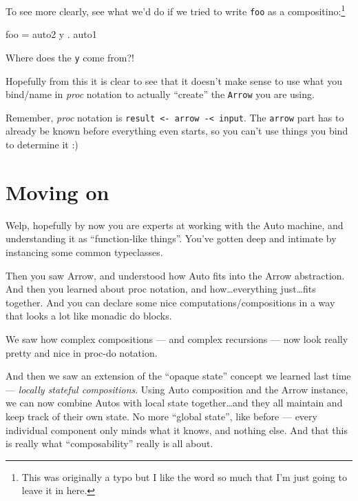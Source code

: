 \documentclass[]{article}
\newenvironment{Shaded}{}{}
\newcommand{\FunctionTok}[1]{\textcolor[rgb]{0.02,0.16,0.49}{#1}}
\newcommand{\NormalTok}[1]{#1}
\begin{document}
To see more clearly, see what we'd do if we tried to write \texttt{foo} as a
compositino:\footnote{This was originally a typo but I like the word so much
  that I'm just going to leave it in here.}

\begin{Shaded}
\begin{Highlighting}[]
\NormalTok{foo }\FunctionTok{=}\NormalTok{ auto2 y }\FunctionTok{.}\NormalTok{ auto1}
\end{Highlighting}
\end{Shaded}

Where does the \texttt{y} come from?!

Hopefully from this it is clear to see that it doesn't make sense to use what
you bind/name in \emph{proc} notation to actually ``create'' the \texttt{Arrow}
you are using.

Remember, \emph{proc} notation is
\texttt{result\ \textless{}-\ arrow\ -\textless{}\ input}. The \texttt{arrow}
part has to already be known before everything even starts, so you can't use
things you bind to determine it :)

\hypertarget{moving-on}{%
\section{Moving on}\label{moving-on}}

Welp, hopefully by now you are experts at working with the Auto machine, and
understanding it as ``function-like things''. You've gotten deep and intimate by
instancing some common typeclasses.

Then you saw Arrow, and understood how Auto fits into the Arrow abstraction. And
then you learned about proc notation, and how\ldots{}everything just\ldots{}fits
together. And you can declare some nice computations/compositions in a way that
looks a lot like monadic do blocks.

We saw how complex compositions --- and complex recursions --- now look really
pretty and nice in proc-do notation.

And then we saw an extension of the ``opaque state'' concept we learned last
time --- \emph{locally stateful compositions}. Using Auto composition and the
Arrow instance, we can now combine Autos with local state together\ldots{}and
they all maintain and keep track of their own state. No more ``global state'',
like before --- every individual component only minds what it knows, and nothing
else. And that this is really what ``composability'' really is all about.
\end{document}
